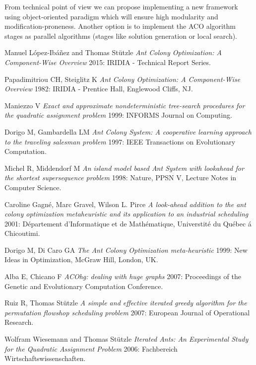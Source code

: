 \documentclass[12pt]{article}
\begin{document}
From technical point of view we can propose implementing a new framework using object-oriented paradigm which will ensure high modularity and modification-proneness. Another option is to implement the ACO algorithm stages as parallel algorithms (stages like solution generation or local search).



\begin{thebibliography}{1}


 Manuel L{\'o}pez-Ib{\'a}{\~n}ez and Thomas St{\"u}tzle {\em Ant Colony Optimization: A Component-Wise Overview} 2015: IRIDIA - Technical Report Series.

 Papadimitriou CH, Steiglitz K {\em Ant Colony Optimization: A Component-Wise Overview} 1982: IRIDIA - Prentice Hall, Englewood Cliffs, NJ.

 Maniezzo V {\em Exact and approximate nondeterministic tree-search procedures for the quadratic assignment problem} 1999: INFORMS Journal on Computing.

 Dorigo M, Gambardella LM {\em Ant Colony System: A cooperative learning
approach to the traveling salesman problem} 1997: IEEE Transactions on Evolutionary
Computation.

 Michel R, Middendorf M {\em An island model based Ant System with
lookahead for the shortest supersequence problem} 1998: Nature, PPSN V, Lecture Notes in Computer Science.

 Caroline Gagn{\'e}, Marc Gravel, Wilson L. Pirce {\em  A look-ahead addition to the ant colony optimization metaheuristic and its application to an industrial scheduling} 2001: D{\'e}partement d'Informatique et de Math{\'e}matique, Universtit{\'e} du Qu{\'e}bec {\'a} Chicoutimi.

 Dorigo M, Di Caro GA {\em The Ant Colony Optimization meta-heuristic} 1999: New Ideas in Optimization, McGraw Hill, London, UK.

 Alba E, Chicano F {\em ACOhg: dealing with huge graphs} 2007: Proceedings of the Genetic and Evolutionary Computation Conference.

 Ruiz R, Thomas St{\"u}tzle {\em A simple and effective iterated greedy algorithm for the permutation flowshop scheduling problem} 2007: European Journal of Operational Research.

 Wolfram Wiesemann and Thomas St{\"u}tzle {\em Iterated Ants: An Experimental Study for the Quadratic Assignment Problem} 2006: Fachbereich Wirtschaftswissenschaften.


\end{thebibliography}
\end{document}
